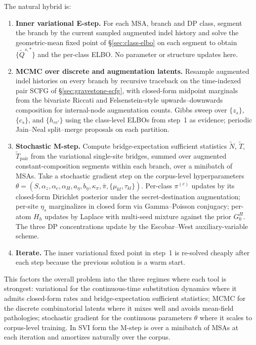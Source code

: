 The natural hybrid is:
\begin{enumerate}
    \item \textbf{Inner variational E-step.} For each MSA, branch
      and DP class, segment the branch by the current sampled
      augmented indel history and solve the geometric-mean fixed
      point of \S\ref{sec:class-elbo} on each segment to obtain
      $\{\tilde Q^{s,*}\}$ and the per-class ELBO. No parameter or
      structure updates here.
    \item \textbf{MCMC over discrete and augmentation latents.}
      Resample augmented indel histories on every branch by recursive
      traceback on the time-indexed pair SCFG of
      \S\ref{sec:gravestone-scfg}, with closed-form midpoint
      marginals from the bivariate Riccati and Felsenstein-style
      upwards--downwards composition for internal-node augmentation
      counts. Gibbs sweep over $\{z_s\}$, $\{c_s\}$, and
      $\{h_{cc'}\}$ using the class-level ELBOs from step~1 as
      evidence; periodic Jain--Neal split--merge proposals on each
      partition.
    \item \textbf{Stochastic M-step.} Compute bridge-expectation
      sufficient statistics $\tilde N$, $\tilde T$,
      $\tilde T_{\mathrm{pair}}$ from the variational single-site
      bridges, summed over augmented constant-composition segments
      within each branch, over a minibatch of MSAs. Take a stochastic
      gradient step on the corpus-level hyperparameters
      $\theta = (S, \alpha_z, \alpha_c, \alpha_H, a_\eta, b_\eta, \kappa_\pi, \bar\pi, \{\mu_{kl}, \tau_{kl}\})$.
      Per-class $\pi^{(c)}$ updates by its closed-form Dirichlet
      posterior under the secret-destination augmentation; per-site
      $\eta_s$ marginalizes in closed form via Gamma--Poisson
      conjugacy; per-atom $H_h$ updates by Laplace with multi-seed
      mixture against the prior $G_0^H$. The three DP concentrations
      update by the Escobar--West auxiliary-variable scheme.
    \item \textbf{Iterate.} The inner variational fixed point in
      step~1 is re-solved cheaply after each step because the
      previous solution is a warm start.
\end{enumerate}

This factors the overall problem into the three regimes where each
tool is strongest: variational for the continuous-time substitution
dynamics where it admits closed-form rates and bridge-expectation
sufficient statistics; MCMC for the discrete combinatorial latents
where it mixes well and avoids mean-field pathologies; stochastic
gradient for the continuous parameters $\theta$ where it scales to
corpus-level training. In SVI form the M-step is over a minibatch
of MSAs at each iteration and amortizes naturally over the corpus.

